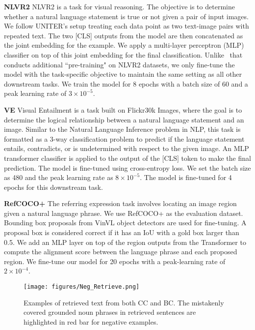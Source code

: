 \noindent\textbf{NLVR2}
NLVR2 is a task for visual reasoning. The objective is to determine whether a natural language statement is true or not given a pair of input images. 
We follow UNITER's setup treating each data point as two text-image pairs with repeated text. 
The two [CLS] outputs from the model are then concatenated as the joint embedding for the example. We apply a multi-layer perceptron (MLP) classifier on top of this joint embedding for the final classification. Unlike~\cite{li2020unsupervised} that conducts additional ``pre-training" on NLVR2 datasets, we only fine-tune the model with the task-specific objective to maintain the same setting as all other downstream tasks. We train the model for 8 epochs with a batch size of 60 and a peak learning rate of $3\times10^{-5}$. 

\noindent\textbf{VE}
Visual Entailment is a task built on Flickr30k Images\cite{young-etal-2014-image}, where the goal is to determine the logical relationship between a natural language statement and an image. Similar to the Natural Language Inference problem in NLP, this task is formatted as a 3-way classification problem to predict if the language statement entails, contradicts, or is undetermined with respect to the given image. An MLP transformer classifier is applied to the output of the $\text{[CLS]}$ token to make the final prediction. The model is fine-tuned using cross-entropy loss. We set the batch size as 480 and the peak learning rate as $8\times10^{-5}$. The model is fine-tuned for 4 epochs for this downstream task. 

\noindent\textbf{RefCOCO+}
The referring expression task involves locating an image region given a natural language phrase. We use RefCOCO+ \cite{yu2016modeling} as the evaluation dataset. Bounding box proposals from VinVL object detectors are used for fine-tuning. A proposal box is considered correct if it has an IoU with a gold box larger than 0.5. We add an MLP layer on top of the region outputs from the Transformer to compute the alignment score between the language phrase and each proposed region. We fine-tune our model for 20 epochs with a peak-learning rate of $2\times10^{-4}$.


\begin{figure*}[h!]
\centering
\texttt{[image: figures/Neg\_Retrieve.png]}
\vspace{-0.1cm}
\caption{Examples of retrieved text from both CC and BC. The mistakenly covered grounded noun phrases in retrieved sentences are highlighted in red bar for negative examples.}
\label{fig:neg-ret}
\end{figure*}

